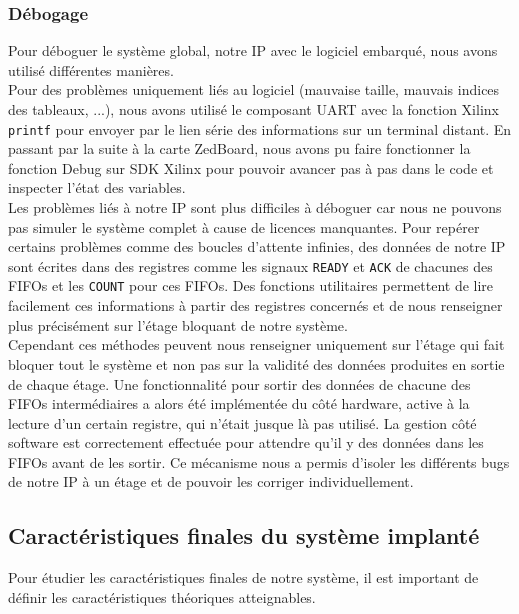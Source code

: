 \subsubsection{Débogage}
Pour déboguer le système global, notre IP avec le logiciel embarqué, nous avons
utilisé différentes manières. \\
Pour des problèmes uniquement liés au logiciel (mauvaise taille, mauvais indices
des tableaux, ...),
nous avons utilisé le composant
UART avec la fonction Xilinx \texttt{printf} pour envoyer par le lien série des
informations sur un terminal distant. En passant par la suite à la carte ZedBoard,
nous avons pu faire fonctionner la fonction Debug sur SDK Xilinx pour pouvoir
avancer pas à pas dans le code et inspecter l'état des variables. \\
Les problèmes liés à notre IP sont plus difficiles à déboguer car nous ne pouvons
pas simuler le système complet à cause de licences manquantes. Pour repérer
certains problèmes comme des boucles d'attente infinies, des données de
notre IP sont écrites dans des registres comme les signaux \texttt{READY} et
\texttt{ACK} de chacunes des FIFOs et les \texttt{COUNT} pour ces FIFOs. Des
fonctions utilitaires permettent de lire facilement ces informations à partir
des registres concernés et de nous renseigner plus précisément sur
l'étage bloquant de notre système. \\
Cependant ces méthodes peuvent nous renseigner uniquement sur l'étage qui
fait bloquer tout le système et non pas sur la validité des données produites
en sortie de chaque étage. Une fonctionnalité pour sortir des données de chacune
des FIFOs intermédiaires a alors été implémentée du côté hardware, active à la
lecture d'un certain registre, qui n'était jusque là pas utilisé. La gestion
côté software est correctement effectuée pour attendre qu'il y des données dans
les FIFOs avant de les sortir. Ce mécanisme nous a permis d'isoler les différents
bugs de notre IP à un étage et de pouvoir les corriger individuellement.

\subsection{Caractéristiques finales du système implanté}
Pour étudier les caractéristiques finales de notre système, il est important
de définir les caractéristiques théoriques atteignables.

